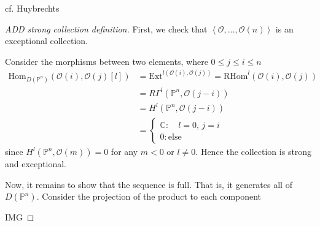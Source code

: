 cf. Huybrechts
\begin{proof}
[ADD strong collection definition]

First, we check that $\left< \mathcal{O}, \dots, \mathcal{O} (n) \right>$ is an exceptional collection. 

Consider the morphisms between two elements, where $0\leq j\leq i \leq n$ $$
\begin{align}
\text{Hom}_{D(\mathbb{P}^{n})} (\mathcal{O}(i),\mathcal{O}(j)[l]) &= \text{Ext}^{l(\mathcal{O}(i),\mathcal{O}(j))}= \text{RHom}^{l}(\mathcal{O}(i),\mathcal{O}(j)) \\ 
&= R\Gamma^{l}(\mathbb{P}^{n},\mathcal{O}(j-i))  \\
&= H^{l}(\mathbb{P}^{n},\mathcal{O}(j-i)) \\
&= \begin{cases}
\mathbb{C} :\quad l=0, \,j=i \\
0 : \text{else}
\end{cases}
\end{align}
$$
since $H^{l}(\mathbb{P}^{n}, \mathcal{O}(m))=0$ for any $m<0$ or $l \neq 0$. Hence the collection is strong and exceptional. 

Now, it remains to show that the sequence is full. That is, it generates all of $D(\mathbb{P}^{n})$.  Consider the projection of the product to each component 

IMG


\end{proof}
